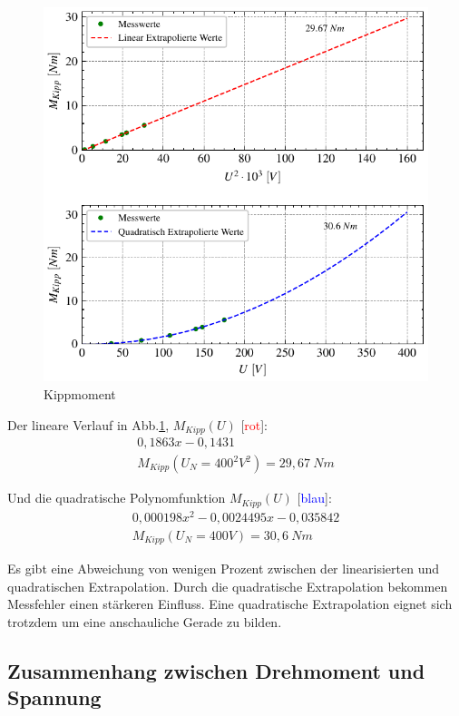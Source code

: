 \documentclass[conference]{IEEEtran}
\begin{document}


\begin{figure}[htbp]
    \centering
    \includegraphics[width=\columnwidth]{./figures/kippmoment.pdf}
    \caption{Kippmoment}
    \label{fig:Kippmoment}
\end{figure}

Der lineare Verlauf in Abb.\ref{fig:Kippmoment}, $M_{\textit{Kipp}}(U)$ [\textcolor{red}{rot}]:
\begin{gather*}
    0,1863 x - 0,1431\\
    M_{Kipp}(U_N=400^2V^2)=29,67 \ \si{Nm}
\end{gather*}

Und die quadratische Polynomfunktion $M_{\textit{Kipp}}(U)$ [\textcolor{blue}{blau}]:
\begin{gather*}
    0,000198 x^2 - 0,0024495 x -0,035842\\
    M_{Kipp}(U_N=400V)=30,6\ \si{Nm}
\end{gather*}

Es gibt eine Abweichung von wenigen Prozent zwischen der linearisierten und
quadratischen Extrapolation. Durch die quadratische Extrapolation bekommen
Messfehler einen stärkeren Einfluss. Eine quadratische Extrapolation eignet
sich trotzdem um eine anschauliche Gerade zu bilden.


\subsection{Zusammenhang zwischen Drehmoment und Spannung}
\end{document}
